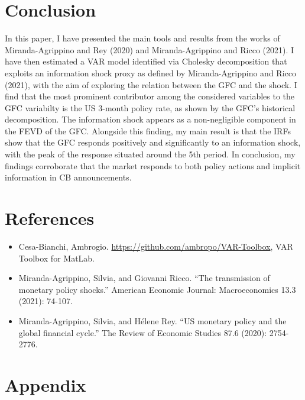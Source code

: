\documentclass[11pt,a4paper]{article}
\begin{document}
\section{Conclusion}
In this paper, I have presented the main tools and results from the works of Miranda-Agrippino and Rey (2020) and Miranda-Agrippino and Ricco (2021). I have then estimated a VAR model identified via Cholesky decomposition that exploits an information shock proxy as defined by Miranda-Agrippino and Ricco (2021), with the aim of exploring the relation between the GFC and the shock.
I find that the most prominent contributor among the considered variables to the GFC variabilty is the US 3-month policy rate, as shown by the GFC's historical decomposition. The information shock appears as a non-negligible component in the FEVD of the GFC. Alongside this finding, my main result is that the IRFs show that the GFC responds positively and significantly to an information shock, with the peak of the response situated around the 5th period. 
In conclusion, my findings corroborate that the market responds to both policy actions and implicit information in CB announcements. 




\section*{References}
\begin{itemize}
    \item Cesa-Bianchi, Ambrogio. \url{https://github.com/ambropo/VAR-Toolbox}, VAR Toolbox for MatLab.
    \item Miranda-Agrippino, Silvia, and Giovanni Ricco. \enquote{The transmission of monetary policy shocks.} American Economic Journal: Macroeconomics 13.3 (2021): 74-107.
    \item Miranda-Agrippino, Silvia, and Hélene Rey. \enquote{US monetary policy and the global financial cycle.} The Review of Economic Studies 87.6 (2020): 2754-2776.
\end{itemize}



\section*{Appendix}
\end{document}
